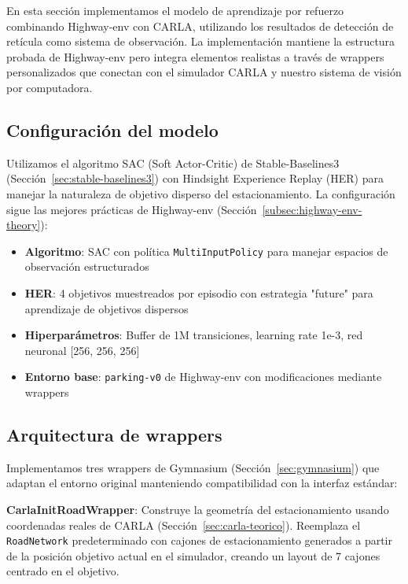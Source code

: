 
En esta sección implementamos el modelo de aprendizaje por refuerzo combinando Highway-env con CARLA,
utilizando los resultados de detección de retícula como sistema de observación. La implementación
mantiene la estructura probada de Highway-env pero integra elementos realistas a través de wrappers
personalizados que conectan con el simulador CARLA y nuestro sistema de visión por computadora.

\subsection{Configuración del modelo}

Utilizamos el algoritmo SAC (Soft Actor-Critic) de Stable-Baselines3 (Sección~\ref{sec:stable-baselines3})
con Hindsight Experience Replay (HER) para manejar la naturaleza de objetivo disperso del estacionamiento.
La configuración sigue las mejores prácticas de Highway-env (Sección~\ref{subsec:highway-env-theory}):

\begin{itemize}
    \item \textbf{Algoritmo}: SAC con política \texttt{MultiInputPolicy} para manejar espacios de observación estructurados
    \item \textbf{HER}: 4 objetivos muestreados por episodio con estrategia "future" para aprendizaje de objetivos dispersos
    \item \textbf{Hiperparámetros}: Buffer de 1M transiciones, learning rate 1e-3, red neuronal [256, 256, 256]
    \item \textbf{Entorno base}: \texttt{parking-v0} de Highway-env con modificaciones mediante wrappers
\end{itemize}

\subsection{Arquitectura de wrappers}

Implementamos tres wrappers de Gymnasium (Sección~\ref{sec:gymnasium}) que adaptan el entorno original
manteniendo compatibilidad con la interfaz estándar:


\textbf{CarlaInitRoadWrapper}: Construye la geometría del estacionamiento usando coordenadas reales de CARLA
(Sección~\ref{sec:carla-teorico}). Reemplaza el \texttt{RoadNetwork} predeterminado con cajones de estacionamiento
generados a partir de la posición objetivo actual en el simulador, creando un layout de 7 cajones centrado
en el objetivo.


